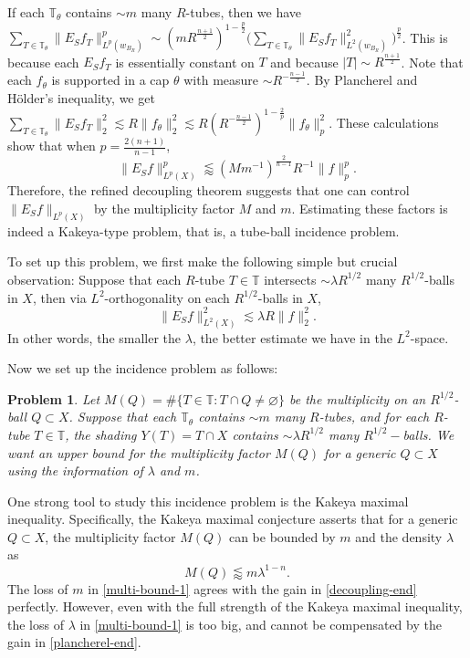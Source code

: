 \documentclass{amsart}
\numberwithin{equation}{section}
\newtheorem{problem}[theorem]{Problem}
\newcommand{\la}{\lambda}
\newcommand{\ZT}{\mathbb{T}}
\begin{document}
If each $\ZT_\theta$ contains $\sim m$ many $R$-tubes, then we have $\sum_{T\in\ZT_\theta}\|E_Sf_T\|_{L^p(w_{B_R})}^p\sim (mR^\frac{n+1}{2})^{1-\frac{p}{2}}\big(\sum_{T\in\ZT_\theta}\|E_Sf_T\|_{L^2(w_{B_R})}^2\big)^{\frac{p}{2}}$. This is because each $E_Sf_T$ is essentially constant on $T$ and because $|T|\sim R^\frac{n+1}{2}$.
Note that each $f_\theta$ is supported in a cap $\theta$ with measure $\sim R^{-\frac{n-1}{2}}$.
By Plancherel and H\"older's inequality, we get $\sum_{T\in\ZT_\theta}\|E_Sf_T\|_2^2\lesssim R \|f_\theta\|_2^2\lesssim R (R^{-\frac{n-1}{2}})^{1-\frac{2}{p}}\|f_\theta\|_p^2$.
These calculations show that when $p=\frac{2(n+1)}{n-1}$,
\begin{equation}
\label{decoupling-end}
    \|E_Sf\|_{L^p(X)}^p\lessapprox (Mm^{-1})^{\frac{2}{n-1}}R^{-1}\|f\|_p^p.
\end{equation}
Therefore, the refined decoupling theorem suggests that one can control $\|E_Sf\|_{L^p(X)}$ by the multiplicity factor $M$ and $m$. 
Estimating these factors is indeed a Kakeya-type problem, that is, a tube-ball incidence problem. 

\smallskip

To set up this problem, we first make the following simple but crucial observation: Suppose that each $R$-tube $T\in\ZT$ intersects $\sim \la R^{1/2}$ many $R^{1/2}$-balls in $X$, then via $L^2$-orthogonality on each $R^{1/2}$-balls in $X$,
\begin{equation}
\label{plancherel-end}
    \|E_Sf\|_{L^2(X)}^2\lesssim \la R\|f\|_2^2.
\end{equation}
In other words, the smaller the $\lambda$, the better estimate we have in the $L^2$-space.

Now we set up the incidence problem as follows:

\begin{problem}
\label{incidence-problem}
\rm
Let $M(Q)=\#\{T\in\ZT:  T\cap Q\not=\varnothing\}$ be the multiplicity on an $R^{1/2}$-ball $Q\subset X$. 
Suppose that each $\ZT_\theta$ contains $\sim m$ many $R$-tubes, and for each $R$-tube $T\in\ZT$, the shading $Y(T)=T\cap X$ contains $\sim \la R^{1/2}$ many $R^{1/2}-$balls.
We want an upper bound for the multiplicity factor $M(Q)$ for a generic $Q\subset X$ using the information of $\la$ and $m$.
\end{problem}



One strong tool to study this incidence problem is the Kakeya maximal inequality. 
Specifically, the Kakeya maximal conjecture asserts that for a generic $Q\subset X$, the multiplicity factor $M(Q)$ can be bounded by $m$ and the density $\la$ as
\begin{equation}
\label{multi-bound-1}
    M(Q)\lessapprox m\la^{1-n}.
\end{equation}
The loss of $m$ in \eqref{multi-bound-1} agrees with the gain in \eqref{decoupling-end} perfectly. 
However, even with the full strength of the Kakeya maximal inequality, the loss of $\la$ in \eqref{multi-bound-1} is too big, and cannot be compensated by the gain in \eqref{plancherel-end}. 
\end{document}
